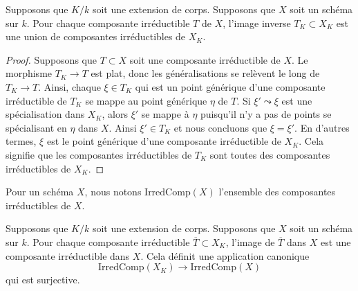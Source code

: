 \begin{lemma}
\label{lemma-inverse-image-irreducible}
Supposons que $K/k$ soit une extension de corps.
Supposons que $X$ soit un schéma sur $k$. Pour chaque
composante irréductible $T$ de $X$, l'image inverse $T_K
\subset X_K$ est une union de composantes irréductibles de $X_K$.
\end{lemma}

\begin{proof}
Supposons que $T \subset X$ soit une composante irréductible de
$X$. Le morphisme $T_K \to T$ est plat, donc les généralisations
se relèvent le long de $T_K \to T$. Ainsi, chaque $\xi \in T_K$
qui est un point générique d'une composante irréductible de
$T_K$ se mappe au point générique $\eta$ de $T$. Si $\xi'
\leadsto \xi$ est une spécialisation dans $X_K$, alors $\xi'$ se
mappe à $\eta$ puisqu'il n'y a pas de points se spécialisant en
$\eta$ dans $X$. Ainsi $\xi' \in T_K$ et nous concluons que $\xi =
\xi'$. En d'autres termes, $\xi$ est le point générique d'une
composante irréductible de $X_K$. Cela signifie que les composantes
irréductibles de $T_K$ sont toutes des composantes irréductibles de $X_K$.
\end{proof}

\noindent
Pour un schéma $X$, nous notons
$\text{IrredComp}(X)$ l'ensemble des composantes irréductibles de $X$.

\begin{lemma}
\label{lemma-image-irreducible}
Supposons que $K/k$ soit une extension de corps.
Supposons que $X$ soit un schéma sur $k$. Pour chaque
composante irréductible $\overline{T} \subset X_K$,
l'image de $\overline{T}$ dans $X$ est une composante
irréductible dans $X$. Cela définit une application canonique
$$
\text{IrredComp}(X_K)
\longrightarrow
\text{IrredComp}(X)
$$
qui est surjective.
\end{lemma}


